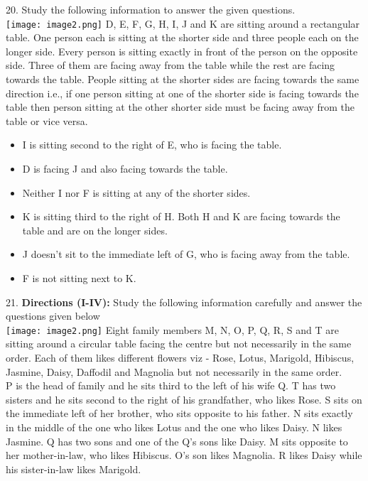 \documentclass[
]{article}
\begin{document}
20. Study the following information to answer the given questions.\\
\texttt{[image: image2.png]}
D, E, F, G, H, I, J and K are sitting around a rectangular table. One person each is sitting at
the shorter side and three people each on the longer side. Every person is sitting exactly in
front of the person on the opposite side. Three of them are facing away from the table while
the rest are facing towards the table. People sitting at the shorter sides are facing towards
the same direction i.e., if one person sitting at one of the shorter side is facing towards the
table then person sitting at the other shorter side must be facing away from the table or vice
versa.\\
\begin{itemize}

\item I is sitting second to the right of E, who is facing the table.
\item D is facing J and also facing towards the table.
\item Neither I nor F is sitting at any of the shorter sides.
\item K is sitting third to the right of H. Both H and K are facing towards the table and are
on the longer sides.
\item J doesn't sit to the immediate left of G, who is facing away from the table.
\item F is not sitting next to K.\\
\end{itemize}

21. \textbf{Directions (I-IV):} Study the following information carefully and answer the questions
given below\\
\texttt{[image: image2.png]}
Eight family members M, N, O, P, Q, R, S and T are sitting around a circular table facing the
centre but not necessarily in the same order. Each of them likes different flowers viz - Rose,
Lotus, Marigold, Hibiscus, Jasmine, Daisy, Daffodil and Magnolia but not necessarily in the
same order.\\
P is the head of family and he sits third to the left of his wife Q. T has two sisters and he sits
second to the right of his grandfather, who likes Rose. S sits on the immediate left of her
brother, who sits opposite to his father. N sits exactly in the middle of the one who likes
Lotus and the one who likes Daisy. N likes Jasmine. Q has two sons and one of the Q’s sons
like Daisy. M sits opposite to her mother-in-law, who likes Hibiscus. O’s son likes Magnolia.
R likes Daisy while his sister-in-law likes Marigold.\\
\end{document}
